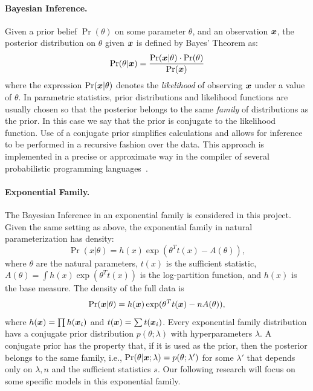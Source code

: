 \documentclass{article}
\begin{document}
\paragraph{Bayesian Inference.}
Given a prior belief $\Pr(\theta)$ on some parameter $\theta$,
and an observation $\boldsymbol{x}$, the posterior distribution on $\theta$
given $\boldsymbol{x}$ is defined by Bayes' Theorem as:
\[
  \Pr(\theta | \boldsymbol{x}) = \frac{\Pr(\boldsymbol{x} | \theta) \cdot \Pr(\theta)}{\Pr(\boldsymbol{x})}
\]
where the expression $\Pr(\boldsymbol{x} | \theta)$ denotes the
\emph{likelihood} of observing $\boldsymbol{x}$ under a value of
$\theta$. 
In parametric statistics, prior distributions and likelihood functions are usually chosen so that the posterior
belongs to the same \emph{family} of distributions as the prior. In this case we say that the prior
is conjugate to the likelihood function. Use of a conjugate prior
simplifies calculations and allows for inference to be performed in a
recursive fashion over the data. This approach is implemented in a
precise or approximate way in the compiler of several
probabilistic programming languages~\cite{BartheFGAGHS16}.
%
%
\paragraph{Exponential Family.}
The Bayesian Inference in an exponential family is considered in this project. Given the same setting as above, the exponential family in natural parameterization has density:
%
\[
	\Pr(x | \theta) = h(x) \exp(\theta^{T} t(x) - A(\theta)),
\]
%
where $\theta$ are the natural parameters, $t(x)$ is the sufficient statistic,
$A(\theta) = \int h(x) \exp(\theta^T t(x))$
is the log-partition function, and $h(x)$ is the base measure.
The density of the full data is
\[
	\Pr(\boldsymbol{x} | \theta) = 
	h(\boldsymbol{x}) \exp(\theta^{T} t(\boldsymbol{x}) - nA(\theta)),
\]
%
where $h(\boldsymbol{x}) = \prod h(\boldsymbol{x}_i)$ and 
$t(\boldsymbol{x}) = \sum t(\boldsymbol{x}_i)$.
%
Every exponential family distribution havs a conjugate prior distribution $p(\theta; \lambda)$
with hyperparameters $\lambda$. 
A conjugate prior has the property that, if it is used as the prior, 
then the posterior belongs to the same family, i.e., $\Pr(\theta | \boldsymbol{x}; \lambda) = p(\theta;\lambda')$ 
for some $\lambda'$ that depends only on $\lambda, n$ and the sufficient statistics $s$.
%
Our following research will focus on some specific models in this exponential family. 
\end{document}
